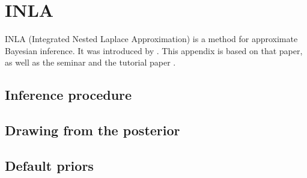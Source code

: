\documentclass[thesis.tex]{subfiles}
\begin{document}
\chapter{INLA} \label{transmission:sec:INLA}


INLA (Integrated Nested Laplace Approximation) is a method for approximate Bayesian inference.
It was introduced by \textcite{rueINLA}.
This appendix is based on that paper, as well as the seminar \textcite{rueINLAseminar} and the tutorial paper \textcite{martinoINLAtutorial}.

\section{Inference procedure} \label{transmission:sec:INLA:inference}

\section{Drawing from the posterior} \label{transmission:sec:INLA:posterior}

\section{Default priors} \label{transmission:sec:INLA:priors}
\end{document}

